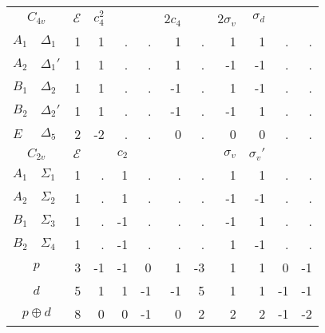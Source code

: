 \documentclass[preprint,showpacs,preprintnumbers,superscriptaddress,prb,floatfix,aps]{revtex4-1}
\newcommand*{\id}{\mathcal{E}}
\begin{document}
\begin{table}
\begin{ruledtabular}
\begin{tabular*}{10cm}{llrrrrrrrrrr}
\multicolumn{2}{c}{$C_{4v}$}      &$\id$& $c_4^2$&        &        & 2$c_4$ &      & 2$\sigma_v$ &  $\sigma_d$ &             &             \\ 
$A_1$           & $\Delta_{1}  $  &  1  &     1  &     .  &     .  &     1  &   .  &          1  &          1  &          .  &          .  \\         %
$A_2$           & $\Delta_{1}' $  &  1  &     1  &     .  &     .  &     1  &   .  &         -1  &         -1  &          .  &          .  \\         %
$B_1$           & $\Delta_{2}  $  &  1  &     1  &     .  &     .  &    -1  &   .  &          1  &         -1  &          .  &          .  \\         %
$B_2$           & $\Delta_{2}' $  &  1  &     1  &     .  &     .  &    -1  &   .  &         -1  &          1  &          .  &          .  \\         %
$E$             & $\Delta_{5}  $  &  2  &    -2  &     .  &     .  &     0  &   .  &          0  &          0  &          .  &          .  \\ \hline  %
\multicolumn{2}{c}{$C_{2v}$}      &$\id$&        &  $c_2$ &        &        &      &  $\sigma_v$ & $\sigma_v'$ &             &             \\
$A_{1}$         & $\Sigma_{1}  $  &  1  &     .  &     1  &     .  &     .  &   .  &          1  &          1  &          .  &          .  \\
$A_{2}$         & $\Sigma_{2}  $  &  1  &     .  &     1  &     .  &     .  &   .  &         -1  &         -1  &          .  &          .  \\
$B_{1}$         & $\Sigma_{3}  $  &  1  &     .  &    -1  &     .  &     .  &   .  &         -1  &          1  &          .  &          .  \\
$B_{2}$         & $\Sigma_{4}  $  &  1  &     .  &    -1  &     .  &     .  &   .  &          1  &         -1  &          .  &          .  \\ \hline
\multicolumn{2}{c}{$p$          } &  3  &     -1 &    -1  &     0  &     1  &  -3  &          1  &          1  &          0  &         -1  \\
\multicolumn{2}{c}{$d$          } &  5  &      1 &     1  &    -1  &    -1  &   5  &          1  &          1  &         -1  &         -1  \\
\multicolumn{2}{c}{$p \oplus  d$} &  8  &      0 &     0  &    -1  &     0  &   2  &          2  &          2  &         -1  &         -2  \\

\end{tabular*}
\end{ruledtabular}
\end{table}
\end{document}
